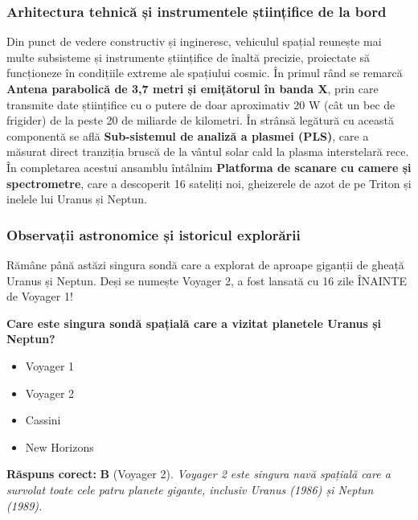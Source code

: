 \subsubsection*{Arhitectura tehnică și instrumentele științifice de la bord}
Din punct de vedere constructiv și ingineresc, vehiculul spațial reunește mai multe subsisteme și instrumente științifice de înaltă precizie, proiectate să funcționeze în condițiile extreme ale spațiului cosmic. În primul rând se remarcă \textbf{Antena parabolică de 3,7 metri și emițătorul în banda X}, prin care transmite date științifice cu o putere de doar aproximativ 20 W (cât un bec de frigider) de la peste 20 de miliarde de kilometri. În strânsă legătură cu această componentă se află \textbf{Sub-sistemul de analiză a plasmei (PLS)}, care a măsurat direct tranziția bruscă de la vântul solar cald la plasma interstelară rece. În completarea acestui ansamblu întâlnim \textbf{Platforma de scanare cu camere și spectrometre}, care a descoperit 16 sateliți noi, gheizerele de azot de pe Triton și inelele lui Uranus și Neptun.

\subsubsection*{Observații astronomice și istoricul explorării}
Rămâne până astăzi singura sondă care a explorat de aproape giganții de gheață Uranus și Neptun. Deși se numește Voyager 2, a fost lansată cu 16 zile ÎNAINTE de Voyager 1!

\vspace{6pt}
\begin{tcolorbox}[orbitarquiz, title={\textbf{Întrebare de verificare \#48: Voyager 2}}]
\textbf{Care este singura sondă spațială care a vizitat planetele Uranus și Neptun?}
\begin{itemize}[leftmargin=2.2em, itemsep=2pt, topsep=4pt]
  \item[$\square$ \textbf{A.}] Voyager 1
  \item[$\square$ \textbf{B.}] Voyager 2
  \item[$\square$ \textbf{C.}] Cassini
  \item[$\square$ \textbf{D.}] New Horizons
\end{itemize}
\vspace{2pt}
{\footnotesize\color{orbitarMuted}\textbf{Răspuns corect:} \textbf{B} (Voyager 2). \emph{Voyager 2 este singura navă spațială care a survolat toate cele patru planete gigante, inclusiv Uranus (1986) și Neptun (1989).}}
\end{tcolorbox}
\clearpage



